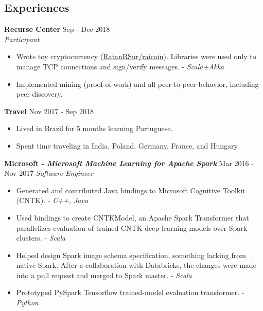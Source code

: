 \documentclass[overlapped]{res}
\begin{document}

\address{\href{https://ratanrsur.github.io}{\underline{ratanrsur.github.io}} \\ \href{https://www.github.com/ratanrsur}{\underline{github.com/ratanrsur}}}
\address{\href{mailto:ratan.r.sur@gmail.com}{\underline{ratan.r.sur@gmail.com}} \\ \hfill +1 646 410 6411\\\hfill{}US Citizen}
\begin{resume}


    \section{Experiences}

    {\bf Recurse Center} \hfill Sep - Dec 2018 \\
    {\em Participant\/}
    \begin{itemize} \itemsep-2pt
        \item
            Wrote toy cryptocurrency (\href{https://www.github.com/ratanrsur/raicoin}{\underline{RatanRSur/raicoin}}).
            Libraries were used only to manage TCP connections and sign/verify messages. - {\em Scala+Akka}
        \item
            Implemented mining (proof-of-work) and all peer-to-peer behavior, including peer discovery.
    \end{itemize}

    {\bf Travel} \hfill Nov 2017 - Sep 2018
    \begin{itemize} \itemsep-2pt
        \item
            Lived in Brazil for 5 months learning Portuguese.
        \item
            Spent time traveling in India, Poland, Germany, France, and Hungary.
    \end{itemize}


    {\bf Microsoft - {\em Microsoft Machine Learning for Apache Spark}} \hfill Mar 2016 - Nov 2017
    {\em Software Engineer}
    \begin{itemize} \itemsep-2pt
        \item
            Generated and contributed Java bindings to Microsoft Cognitive Toolkit (CNTK). - {\em C++, Java}
        \item
            Used bindings to create CNTKModel, an Apache Spark Transformer that parallelizes evaluation of trained CNTK deep learning models over Spark clusters. - {\em Scala\/}
        \item
            Helped design Spark image schema specification, something lacking from native Spark.
            After a collaboration with Databricks, the changes were made into a pull request and merged to Spark master. - {\em Scala\/}
        \item
            Prototyped PySpark Tensorflow trained-model evaluation transformer. - {\em Python\/}
    \end{itemize}


\end{resume}
\end{document}
